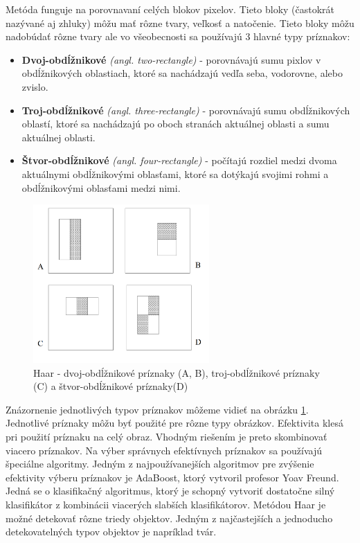 \documentclass[slovak,master,dept460,male,cpp,cpdeclaration]{diploma}
\begin{document}
 Metóda funguje na porovnavaní celých blokov pixelov. Tieto bloky (častokrát nazývané aj zhluky) môžu mať rôzne tvary, veľkosť a natočenie. Tieto bloky môžu nadobúdať rôzne tvary ale vo všeobecnosti sa používajú 3 hlavné typy príznakov:
\begin{itemize}
  \item \textbf{Dvoj-obdĺžnikové} \textit{(angl. two-rectangle)} - porovnávajú sumu pixlov v obdĺžnikových oblastiach, ktoré sa nachádzajú vedľa seba, vodorovne, alebo zvislo.
  \item \textbf{Troj-obdĺžnikové} \textit{(angl. three-rectangle)} - porovnávajú sumu obdĺžnikových oblastí, ktoré sa nachádzajú po oboch stranách aktuálnej oblasti a sumu aktuálnej oblasti.
  \item \textbf{Štvor-obdĺžnikové} \textit{(angl. four-rectangle)} - počítajú rozdiel medzi dvoma aktuálnymi obdĺžnikovými oblasťami, ktoré sa dotýkajú svojimi rohmi a obdĺžnikovými oblasťami medzi nimi.
  
 \end{itemize}
   \begin{figure}[H]
	\centering
	\includegraphics[width=0.6\textwidth]{Figures/haar1.png}
	\caption{Haar - dvoj-obdĺžnikové príznaky (A, B), troj-obdĺžnikové príznaky (C) a štvor-obdĺžnikové príznaky(D)\cite{viola2001robust}}
	\label{fig:Haar1}
\end{figure}
  Znázornenie jednotlivých typov príznakov môžeme vidieť na obrázku \ref{fig:Haar1}. Jednotlivé príznaky môžu byť použité pre rôzne typy obrázkov. Efektivita klesá pri použití príznaku na celý obraz. Vhodným riešením je preto skombinovať viacero príznakov. Na výber  správnych efektívnych príznakov sa používajú špeciálne algoritmy. Jedným z najpoužívanejších algoritmov  pre zvýšenie efektivity výberu príznakov je AdaBoost\cite{freund1995desicion}, ktorý vytvoril profesor Yoav Freund. Jedná se o klasifikačný algoritmus, ktorý je schopný vytvoriť dostatočne silný klasifikátor z kombinácii viacerých slabších klasifikátorov.  Metódou Haar je možné detekovať rôzne triedy objektov. Jedným z najčastejších a jednoducho detekovatelných  typov objektov je napríklad tvár.
\end{document}
